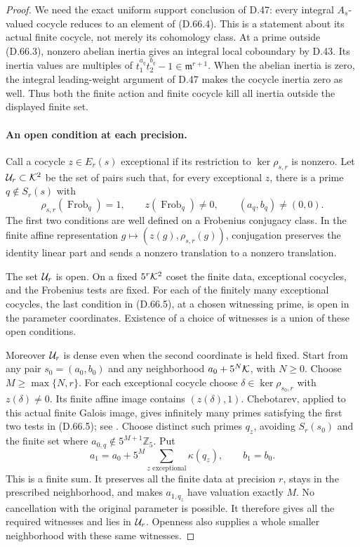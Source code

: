 \begin{proof}
We need the exact uniform support conclusion of D.47:
every integral \(A_s\)-valued cocycle reduces to an
element of (D.66.4). This is a statement about its actual
finite cocycle, not merely its cohomology class. At a prime
outside (D.66.3), nonzero abelian inertia gives an integral
local coboundary by D.43. Its inertia values are multiples
of
\(t_1^{a_q}t_2^{b_q}-1\in\mathfrak m^{r+1}\).
When the abelian inertia is zero, the integral leading-weight
argument of D.47 makes the cocycle inertia zero as well.
Thus both the finite action and finite cocycle kill all
inertia outside the displayed finite set.

\paragraph{An open condition at each precision.}
Call a cocycle \(z\in E_r(s)\) exceptional if its
restriction to \(\ker\rho_{s,r}\) is nonzero. Let
\({\cal U}_r\subset{\cal K}^2\) be the set of pairs
such that, for every exceptional \(z\), there is a prime
\(q\notin S_r(s)\) with
\[
 \rho_{s,r}(\operatorname{Frob}_q)=1,
 \qquad z(\operatorname{Frob}_q)\ne0,
 \qquad (a_q,b_q)\ne(0,0).                            \tag{D.66.5}
\]
The first two conditions are well defined on a Frobenius
conjugacy class. In the finite affine representation
\(g\mapsto(z(g),\rho_{s,r}(g))\), conjugation preserves
the identity linear part and sends a nonzero translation
to a nonzero translation.

The set \({\cal U}_r\) is open. On a fixed
\(5^r{\cal K}^2\) coset the finite data, exceptional
cocycles, and the Frobenius tests are fixed. For each of
the finitely many exceptional cocycles, the last condition
in (D.66.5), at a chosen witnessing prime, is open in
the parameter coordinates. Existence of a choice of
witnesses is a union of these open conditions.

Moreover \({\cal U}_r\) is dense even when the second
coordinate is held fixed. Start from any pair
\(s_0=(a_0,b_0)\) and any neighborhood
\(a_0+5^N{\cal K}\), with \(N\ge0\). Choose
\(M\ge\max\{N,r\}\). For each exceptional cocycle
choose \(\delta\in\ker\rho_{s_0,r}\) with
\(z(\delta)\ne0\). Its finite affine image contains
\((z(\delta),1)\). Chebotarev, applied to this actual
finite Galois image, gives infinitely many primes
satisfying the first two tests in (D.66.5); see
\cite[Chapter V, Theorem 3.23]{PBC_MilneCFT}.
Choose distinct such primes \(q_z\), avoiding
\(S_r(s_0)\) and the finite set where
\(a_{0,q}\notin5^{M+1}\mathbb Z_5\). Put
\[
          a_1=a_0+5^M\sum_{z\text{ exceptional}}\kappa(q_z),
          \qquad b_1=b_0.                             \tag{D.66.6}
\]
This is a finite sum. It preserves all the finite data
at precision \(r\), stays in the prescribed neighborhood,
and makes \(a_{1,q_z}\) have valuation exactly \(M\).
No cancellation with the original parameter is possible.
It therefore gives all the required witnesses and lies in
\({\cal U}_r\). Openness also supplies a whole smaller
neighborhood with these same witnesses.


\end{proof}
